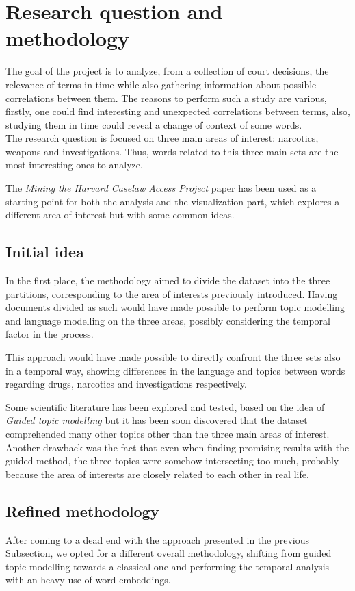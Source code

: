 \section{Research question and methodology}

The goal of the project is to analyze, from a collection 
of court decisions, the relevance of terms in time while 
also gathering information about possible correlations between 
them. The reasons to perform such a study are various, firstly, 
one could find interesting and unexpected correlations between terms, 
also, studying them in time could reveal a change of 
context of some words.\\
The research question is focused on three main areas of interest:
narcotics, weapons and investigations. Thus, words related to this three main sets
are the most interesting ones to analyze.

The \emph{Mining the Harvard Caselaw Access Project} paper has been used as a starting point for
both the analysis and the visualization part, which explores a different area of interest but with some
common ideas.~\cite{harvard_caselaw}

\subsection{Initial idea}
\label{res-med}
In the first place, the methodology aimed to divide the dataset into the three partitions, 
corresponding to the area of interests previously introduced. 
Having documents divided as such would have made possible to perform topic modelling and language modelling
on the three areas, possibly considering the temporal factor in the process.

\noindent This approach would have made possible to directly confront the three sets also in a temporal way, showing differences in
the language and topics between words regarding drugs, narcotics and investigations respectively.

Some scientific literature has been explored and tested, based on the idea of \emph{Guided topic modelling} 
but it has been soon discovered that the dataset comprehended many other topics other than the
three main areas of interest.~\cite{glda} Another drawback was the fact that even when finding promising results 
with the guided method, the three topics were somehow intersecting too much, probably because the 
area of interests are closely related to each other in real life.

\subsection{Refined methodology}

After coming to a dead end with the approach presented in the previous Subsection, we opted for a different
overall methodology, shifting from guided topic modelling towards a classical one and performing the temporal
analysis with an heavy use of word embeddings.